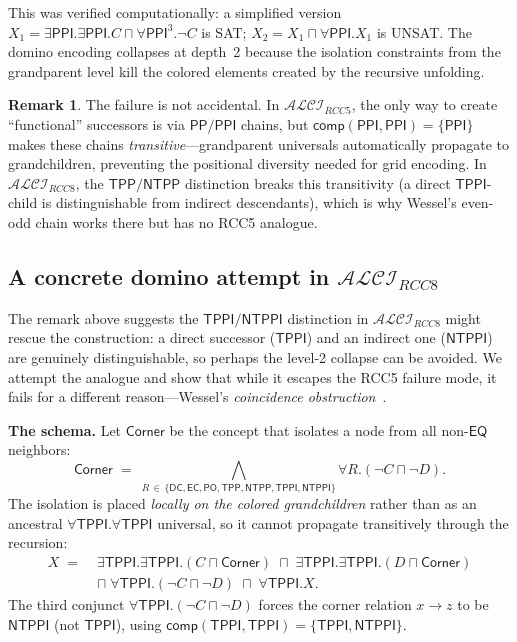 \documentclass[
]{ceurart}
\theoremstyle{definition}
\newtheorem{remark}[theorem]{Remark}
\newcommand{\ALCIRCC}[1]{\ensuremath{\mathcal{ALCI}_{\mathit{RCC#1}}}}
\newcommand{\PO}{\ensuremath{\mathsf{PO}}}
\newcommand{\EQ}{\ensuremath{\mathsf{EQ}}}
\newcommand{\PP}{\ensuremath{\mathsf{PP}}}
\newcommand{\PPI}{\ensuremath{\mathsf{PPI}}}
\newcommand{\TPP}{\ensuremath{\mathsf{TPP}}}
\newcommand{\NTPP}{\ensuremath{\mathsf{NTPP}}}
\newcommand{\TPPI}{\ensuremath{\mathsf{TPPI}}}
\newcommand{\NTPPI}{\ensuremath{\mathsf{NTPPI}}}
\newcommand{\DC}{\ensuremath{\mathsf{DC}}}
\newcommand{\EC}{\ensuremath{\mathsf{EC}}}
\newcommand{\comp}{\ensuremath{\mathsf{comp}}}
\begin{document}
This was verified computationally: a simplified version
$X_1 = \exists\PPI.\exists\PPI.C \sqcap \forall\PPI^3.\neg C$
is SAT; $X_2 = X_1 \sqcap \forall\PPI.X_1$ is UNSAT.
The domino encoding collapses at depth~2 because the isolation
constraints from the grandparent level kill the colored elements
created by the recursive unfolding.

\begin{remark}
The failure is not accidental.  In $\ALCIRCC{5}$, the only way to
create ``functional'' successors is via $\PP/\PPI$ chains, but
$\comp(\PPI,\PPI) = \{\PPI\}$ makes these chains
\emph{transitive}---grandparent universals automatically propagate
to grandchildren, preventing the positional diversity needed for
grid encoding.  In $\ALCIRCC{8}$, the $\TPP/\NTPP$ distinction
breaks this transitivity (a direct $\TPPI$-child is distinguishable
from indirect descendants), which is why Wessel's even-odd chain
works there but has no RCC5 analogue.
\end{remark}

\subsection{A concrete domino attempt in $\ALCIRCC{8}$}
\label{sec:domino-attempt-rcc8}

The remark above suggests the $\TPPI/\NTPPI$ distinction in
$\ALCIRCC{8}$ might rescue the construction: a direct successor
($\TPPI$) and an indirect one ($\NTPPI$) are genuinely
distinguishable, so perhaps the level-2 collapse can be avoided.
We attempt the analogue and show that while it escapes the RCC5
failure mode, it fails for a different reason---Wessel's
\emph{coincidence obstruction}~\cite{Wessel2003}.

\medskip\noindent\textbf{The schema.} Let $\textsf{Corner}$ be the
concept that isolates a node from all non-$\EQ$ neighbors:
\[
  \textsf{Corner} \;=\;
  \bigwedge_{R \,\in\, \{\DC,\EC,\PO,\TPP,\NTPP,\TPPI,\NTPPI\}}
    \forall R.(\neg C \sqcap \neg D).
\]
The isolation is placed \emph{locally on the colored grandchildren}
rather than as an ancestral $\forall\TPPI.\forall\TPPI$ universal,
so it cannot propagate transitively through the recursion:
\begin{align*}
  X \;=\; &\exists\TPPI.\exists\TPPI.(C \sqcap \textsf{Corner})
    \;\sqcap\; \exists\TPPI.\exists\TPPI.(D \sqcap \textsf{Corner}) \\
  &\sqcap\; \forall\TPPI.(\neg C \sqcap \neg D)
    \;\sqcap\; \forall\TPPI.X.
\end{align*}
The third conjunct $\forall\TPPI.(\neg C \sqcap \neg D)$ forces the
corner relation $x \to z$ to be $\NTPPI$ (not $\TPPI$), using
$\comp(\TPPI,\TPPI) = \{\TPPI, \NTPPI\}$.
\end{document}
